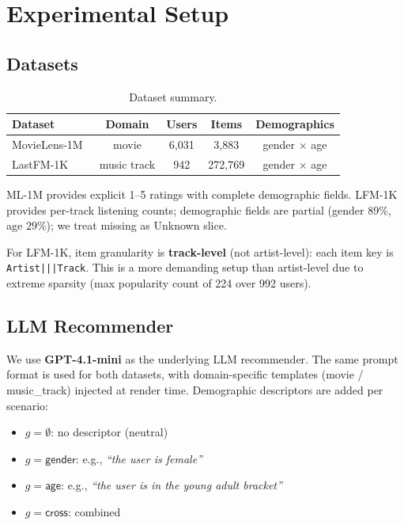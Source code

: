 \section{Experimental Setup}
\label{sec:setup}

\subsection{Datasets}

\begin{table}[h]
\caption{Dataset summary.}
\label{tab:datasets}
\begin{tabular}{lcccc}
\toprule
Dataset & Domain & Users & Items & Demographics \\
\midrule
MovieLens-1M~\cite{harper2016movielens} & movie & 6{,}031 & 3{,}883 & gender $\times$ age \\
LastFM-1K~\cite{celma2010longtail} & music track & 942 & 272{,}769 & gender $\times$ age \\
\bottomrule
\end{tabular}
\end{table}

ML-1M provides explicit 1--5 ratings with complete demographic fields. LFM-1K provides per-track listening counts; demographic fields are partial (gender $89\%$, age $29\%$); we treat missing as \textsf{Unknown} slice.

For LFM-1K, item granularity is \textbf{track-level} (not artist-level): each item key is \texttt{Artist|||Track}. This is a more demanding setup than artist-level due to extreme sparsity (max popularity count of 224 over 992 users).

\subsection{LLM Recommender}

We use \textbf{GPT-4.1-mini} as the underlying LLM recommender. The same prompt format is used for both datasets, with domain-specific templates (movie / music\_track) injected at render time. Demographic descriptors are added per scenario:
\begin{itemize}
\item $g = \emptyset$: no descriptor (neutral)
\item $g = \textsf{gender}$: e.g., \emph{``the user is female''}
\item $g = \textsf{age}$: e.g., \emph{``the user is in the young adult bracket''}
\item $g = \textsf{cross}$: combined
\end{itemize}

